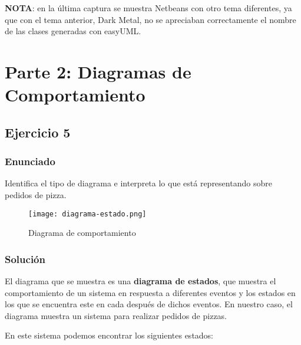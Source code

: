 \textbf{NOTA}: en la última captura se muestra Netbeans con otro tema diferentes, ya que con el tema anterior, Dark Metal, no se apreciaban correctamente el nombre de las clases generadas con easyUML.

\section{Parte 2: Diagramas de Comportamiento}

\subsection{Ejercicio 5}

\subsubsection{Enunciado}
Identifica el tipo de diagrama e interpreta lo que está representando sobre pedidos de pizza.

\begin{figure}[H]
    \centering
    \texttt{[image: diagrama-estado.png]}
    \caption{Diagrama de comportamiento}
\end{figure}

\subsubsection{Solución}
El diagrama que se muestra es una \textbf{diagrama de estados}, que muestra el comportamiento de un sistema en respuesta a diferentes eventos y los estados en los que se encuentra este en cada después de dichos eventos. En nuestro caso, el diagrama muestra un sistema para realizar pedidos de pizzas.

En este sistema podemos encontrar los siguientes estados:

